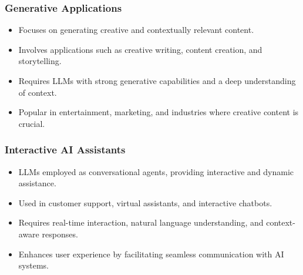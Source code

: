 \begin{frame}[fragile]\frametitle{Generative Applications}

      \begin{itemize}
        \item Focuses on generating creative and contextually relevant content.
        \item Involves applications such as creative writing, content creation, and storytelling.
        \item Requires LLMs with strong generative capabilities and a deep understanding of context.
        \item Popular in entertainment, marketing, and industries where creative content is crucial.
      \end{itemize}
\end{frame}

\begin{frame}[fragile]\frametitle{Interactive AI Assistants}
      \begin{itemize}
        \item LLMs employed as conversational agents, providing interactive and dynamic assistance.
        \item Used in customer support, virtual assistants, and interactive chatbots.
        \item Requires real-time interaction, natural language understanding, and context-aware responses.
        \item Enhances user experience by facilitating seamless communication with AI systems.
      \end{itemize}
\end{frame}

